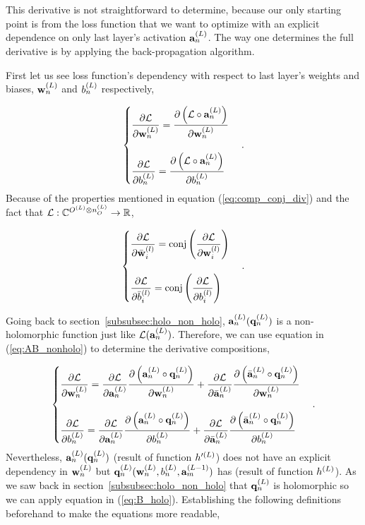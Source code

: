 This derivative is not straightforward to determine, because our only starting point is from the loss function that we want to optimize with an explicit dependence on only last layer's activation $ \act{L}{n} $. The way one determines the full derivative is by applying the back-propagation algorithm.

First let us see loss function's dependency with respect to last layer's weights and biases, $ \w{L}{n} $ and $ \bi{L}{n} $ respectively,

\begin{equation}
	\begin{cases}
		\der{\loss}{\w{L}{n}} = \der{\group{\loss \circ \act{L}{n}}}{\w{L}{n}} \\
		\\
		 \der{\loss}{\bi{L}{n}} = \der{\group{\loss \circ \act{L}{n}}}{\bi{L}{n}}
	\end{cases}.
\end{equation}
Because of the properties mentioned in equation (\ref{eq:comp_conj_div}) and the fact that $ \func[\loss]{\set{C}^{\outsp{L} \otimes \outs{L}}}{\set{R}} $,

\begin{equation}
	\begin{cases}
		\der{\loss}{\cw{l}{i}} = \text{conj}\group{\der{\loss}{\w{l}{i}}} \\
		\\
		\der{\loss}{\cbi{l}{i}} = \text{conj}\group{\der{\loss}{\bi{l}{i}}}
	\end{cases}.
\end{equation}

Going back to section~\ref{subsubsec:holo_non_holo}, $ \act{L}{n}(\pact{L}{n}) $ is a non-holomorphic function just like $ \loss(\act{L}{n})  $. Therefore, we can use equation in (\ref{eq:AB_nonholo}) to determine the derivative compositions,

\begin{equation}
	\begin{cases}
		\der{\loss}{\w{L}{n}} = \der{\loss}{\act{L}{n}}\der{\group{\act{L}{n} \circ \pact{L}{n}}}{\w{L}{n}} + \der{\loss}{\cact{L}{n}}\der{\group{\cact{L}{n} \circ \pact{L}{n}}}{\w{L}{n}} \\
		\\
		\der{\loss}{\bi{L}{n}} = \der{\loss}{\act{L}{n}}\der{\group{\act{L}{n} \circ \pact{L}{n}}}{\bi{L}{n}} + 	\der{\loss}{\cact{L}{n}}\der{\group{\cact{L}{n} \circ \pact{L}{n}}}{\bi{L}{n}} 
	\end{cases}.
\end{equation}
Nevertheless, $ \act{L}{n}(\pact{L}{n}) $ (result of function $ \paf{L} $) does not have an explicit dependency in $ \w{L}{n} $ but $ \pact{L}{n}(\w{L}{n}, \bi{L}{n}, \act{L-1}{m}) $ has (result of function $ \af{L} $). As we saw back in section~\ref{subsubsec:holo_non_holo} that $ \pact{L}{n} $ is holomorphic so we can apply equation in (\ref{eq:B_holo}). Establishing the following definitions beforehand to make the equations more readable,

